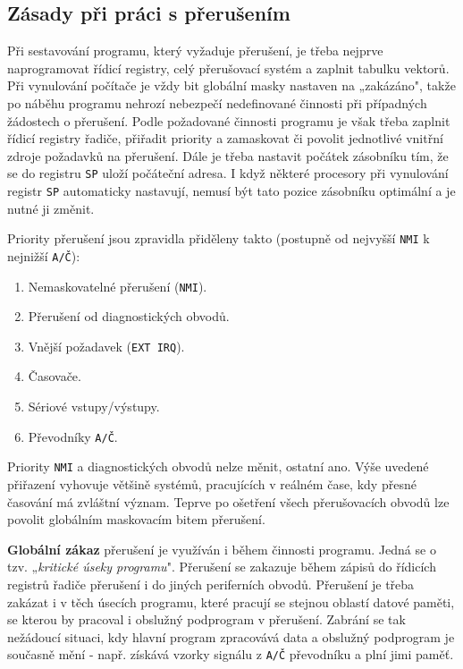     \subsection{Zásady při práci s přerušením}
      Při sestavování programu, který vyžaduje přerušení, je třeba nejprve naprogramovat řídicí 
      registry, celý přerušovací systém a zaplnit tabulku vektorů. Při vynulování počítače je vždy 
      bit globální masky nastaven na „zakázáno", takže po náběhu programu nehrozí nebezpečí 
      nedefinované činnosti při případných žádostech o přerušení. Podle požadované činnosti 
      programu je však třeba zaplnit řídicí registry řadiče, přiřadit priority a zamaskovat či 
      povolit jednotlivé vnitřní zdroje požadavků na přerušení. Dále je třeba nastavit počátek 
      zásobníku tím, že se do registru \texttt{SP} uloží počáteční adresa. I když některé procesory 
      při vynulování registr \texttt{SP} automaticky nastavují, nemusí být tato pozice zásobníku 
      optimální a je nutné ji změnit.
      
      Priority přerušení jsou zpravidla přiděleny takto (postupně od nejvyšší \texttt{NMI} k 
      nejnižší \texttt{A/Č}):
      \begin{enumerate}\addtolength{\itemsep}{-0.5\baselineskip}
        \item Nemaskovatelné přerušení (\texttt{NMI}).
        \item Přerušení od diagnostických obvodů.
        \item Vnější požadavek (\texttt{EXT IRQ}).
        \item Časovače.
        \item Sériové vstupy/výstupy.
        \item Převodníky \texttt{A/Č}.
      \end{enumerate}
      
      Priority \texttt{NMI} a diagnostických obvodů nelze měnit, ostatní ano. Výše uvedené 
      přiřazení vyhovuje většině systémů, pracujících v reálném čase, kdy přesné časování má 
      zvláštní význam. Teprve po ošetření všech přerušovacích obvodů lze povolit globálním 
      maskovacím bitem přerušení.
      
      \textbf{Globální zákaz} přerušení je využíván i během činnosti programu. Jedná se o tzv. 
      „\emph{kritické úseky programu}". Přerušení se zakazuje během zápisů do řídicích registrů 
      řadiče přerušení i do jiných periferních obvodů. Přerušení je třeba zakázat i v těch úsecích 
      programu, které pracují se stejnou oblastí datové paměti, se kterou by pracoval i obslužný 
      podprogram v přerušení. Zabrání se tak nežádoucí situaci, kdy hlavní program zpracovává data 
      a obslužný podprogram je současně mění - např. získává vzorky signálu z \texttt{A/Č} 
      převodníku a plní jimi paměť. 
      
